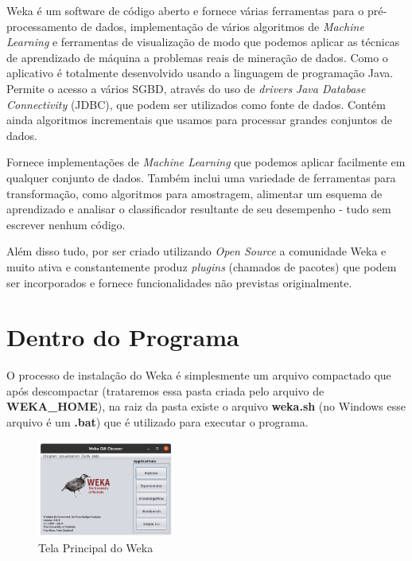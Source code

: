 \documentclass[a4paper,11pt]{article}
\begin{document}
Weka é um software de código aberto e fornece várias ferramentas para o pré-processamento de dados, implementação de vários algoritmos de \textit{Machine Learning} e ferramentas de visualização de modo que podemos aplicar as técnicas de aprendizado de máquina a problemas reais de mineração de dados. Como o aplicativo é totalmente desenvolvido usando a linguagem de programação Java. Permite o acesso a vários SGBD, através do uso de \textit{drivers} \textit{Java Database Connectivity} (JDBC), que podem ser utilizados como fonte de dados. Contém ainda algoritmos incrementais que usamos para processar grandes conjuntos de dados.

Fornece implementações de \textit{Machine Learning} que podemos aplicar facilmente em qualquer conjunto de dados. Também inclui uma variedade de ferramentas para transformação, como algoritmos para amostragem, alimentar um esquema de aprendizado e analisar o classificador resultante de seu desempenho - tudo sem escrever nenhum código.

Além disso tudo, por ser criado utilizando \textit{Open Source} a comunidade Weka e muito ativa e constantemente produz \textit{plugins} (chamados de pacotes) que podem ser incorporados e fornece funcionalidades não previstas originalmente.

\section{Dentro do Programa}
O processo de instalação do Weka é simplesmente um arquivo compactado que após descompactar (trataremos essa pasta criada pelo arquivo de \textbf{WEKA\_HOME}), na raiz da pasta existe o arquivo \textbf{weka.sh} (no Windows esse arquivo é um \textbf{.bat}) que é utilizado para executar o programa. 
\begin{figure}[H]
	\centering
	\includegraphics[width=0.4\textwidth]{imagem/weka-gui.png}
	\caption{Tela Principal do Weka}
\end{figure}
\end{document}
